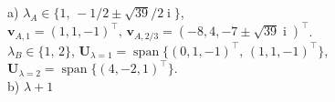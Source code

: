 {
{ a)} $\lambda_A\in \{1,\, -1/2\pm \sqrt{39}/2\operatorname{i}\}$, $\boldsymbol v_{A,1}=(1,1,-1)^\top,\, \boldsymbol
v_{A,2/3}=(-8,4, -7\pm \sqrt{39}\operatorname{i})^\top$. \\
$\lambda_B\in\{1,\, 2\}$, $\boldsymbol U_{\lambda=1}=\operatorname{span}\{(0,1,-1)^\top,\, (1,1,-1)^\top\}$, $\boldsymbol
U_{\lambda=2}=\operatorname{span}\{(4,-2,1)^\top\}$. \\
{ b)} $\lambda+1$

}
